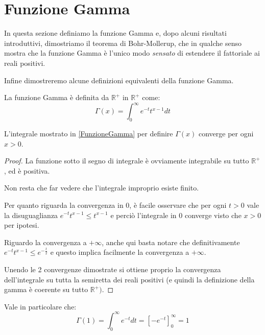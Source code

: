 \section{Funzione Gamma}
In questa sezione definiamo la funzione Gamma e, dopo alcuni risultati introduttivi, dimostriamo il teorema di Bohr-Mollerup, che
in qualche senso mostra che la funzione Gamma è l'unico modo \emph{sensato} di estendere il fattoriale ai reali positivi.

Infine dimostreremo alcune definizioni equivalenti della funzione Gamma.

\begin{definition}\label{FunzioneGamma} 
	La funzione Gamma è definita da $\mathbb{R^+}$ in $\mathbb{R^+}$ come:
	\begin{equation*}
		\Gamma(x)=\int_0^{\infty}{e^{-t}t^{x-1}dt}
	\end{equation*}
\end{definition}

\begin{lemma}\label{GammaConverge}
	L'integrale mostrato in \cref{FunzioneGamma} per definire $\Gamma(x)$ converge per ogni $x>0$.
\end{lemma}
\begin{proof}
	La funzione sotto il segno di integrale è ovviamente integrabile su tutto $\mathbb{R^+}$, ed è positiva.
	
	Non resta che far vedere che l'integrale improprio esiste finito.
	
	Per quanto riguarda la convergenza in 0, è facile osservare che per ogni $t>0$ vale la disuguaglianza $e^{-t}t^{x-1}\le t^{x-1}$ 
	e perciò l'integrale in $0$ converge visto che $x>0$ per ipotesi.
	
	Riguardo la convergenza a $+\infty$, anche qui basta notare che definitivamente $e^{-t}t^{x-1}\le e^{-\frac t2}$
	e questo implica facilmente la convergenza a $+\infty$.
	
	Unendo le 2 convergenze dimostrate si ottiene proprio la convergenza dell'integrale su tutta la semiretta dei reali positivi (e quindi la 
	definizione della gamma è coerente su tutto $\mathbb{R^+})$.
\end{proof}


\begin{remark}\label{ValoreGamma1}
	Vale in particolare che:
	\begin{equation*}
		\Gamma(1)=\int_0^{\infty}{e^{-t}dt}=\left[-e^{-t}\right]_0^{\infty}=1
	\end{equation*}
\end{remark}


